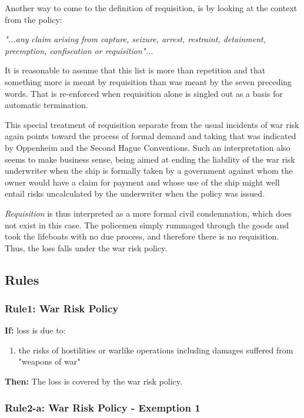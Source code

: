      Another way to come to the definition of requisition, is by looking at the context from the policy:
     
     \textit{ "...any claim arising from capture, seizure, arrest, restraint, detainment, preemption, confiscation or requisition"...}
     
     It is reasonable to assume that this list is more than repetition and that something more is meant by requisition than was meant by the seven preceding words. That is re-enforced when requisition alone is singled out as a basis for automatic termination.
     
     This special treatment of requisition separate from the usual incidents of war risk again points toward the process of formal demand and taking that was indicated by Oppenheim and the Second Hague Conventions. Such an interpretation also seems to make business sense, being aimed at ending the liability of the war risk underwriter when the ship is formally taken by a government against whom the owner would have a claim for payment and whose use of the ship might well entail risks uncalculated by the underwriter when the policy was issued.
     
     \textit{Requisition} is thus interpreted as a more formal civil condemnation, which does not exist in this case. The policemen simply rummaged through the goods and took the lifeboats with no due process, and therefore there is no requisition. Thus, the loss falls under the war risk policy.
     
\subsection{Rules}

\subsubsection{Rule1: War Risk Policy} 

    \textbf{If:} loss is due to:
    
    \begin{enumerate}
         \item the risks of hostilities or warlike operations including damages suffered from "weapons of war"
    \end{enumerate}
    
    
    \textbf{Then:} The loss is covered by the war risk policy.
        
\subsubsection{Rule2-a: War Risk Policy - Exemption 1}

